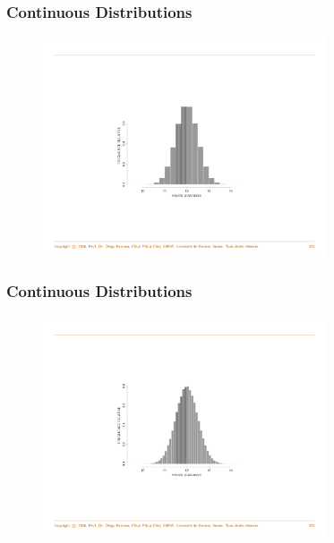 \documentclass[notes=show,smaller,handout]{beamer}
\begin{document}
\begin{frame}%

\frametitle{Continuous Distributions}
\begin{example}[cont'd]
\begin{figure}[ptb]\centering
\includegraphics[width=0.75\textwidth,height=0.75\textheight]{hist2.pdf}
\end{figure}
\end{example}
\end{frame}

\begin{frame}%

\frametitle{Continuous Distributions}
\begin{example}[cont'd]
\begin{figure}
\includegraphics[width=0.75\textwidth,height=0.75\textheight]{hist3.pdf}
\end{figure}
\end{example}
\end{frame}


%
%
%
\end{document}
